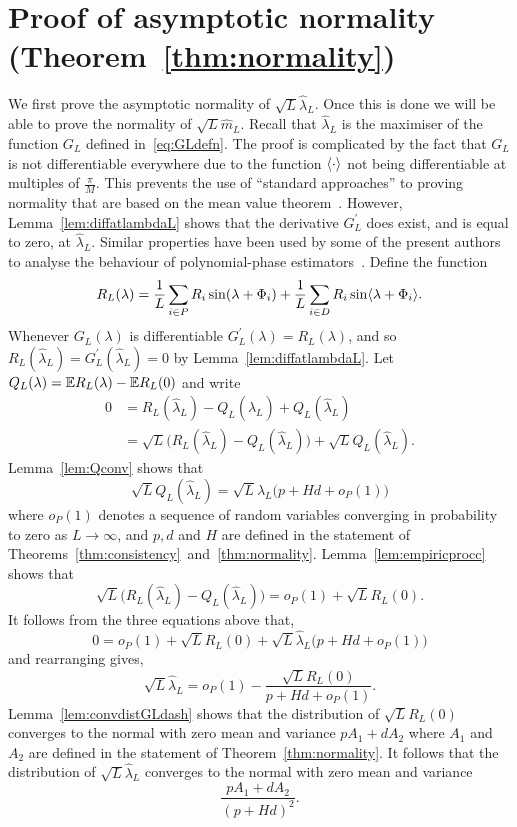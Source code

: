 \documentclass[draftcls, onecolumn, 11pt]{IEEEtran}
\begin{document}
\section{Proof of asymptotic normality (Theorem~\ref{thm:normality}) } \label{sec:proof-asympt-norm}

We first prove the asymptotic normality of $\sqrt{L} \hat{\lambda}_L$.  Once this is done we will be able to prove the normality of $\sqrt{L} \hat{m}_L$.  Recall that $\hat{\lambda}_L$ is the maximiser of the function $G_L$ defined in~\eqref{eq:GLdefn}.  The proof is complicated by the fact that $G_L$ is not differentiable everywhere due to the function $\left\langle \cdot \right\rangle$ not being differentiable at multiples of $\tfrac{\pi}{M}$.  This prevents the use of ``standard approaches'' to proving normality that are based on the mean value theorem~\cite{vonMises_diff_stats_1947,vanDerVart1971_asymptotic_stats,Pollard_new_ways_clts_1986,Pollard_conv_stat_proc_1984,Pollard_asymp_empi_proc_1989,van2009empirical}.  However, Lemma~\ref{lem:diffatlambdaL} shows that the derivative $G_L^\prime$ does exist, and is equal to zero, at $\hat{\lambda}_L$.  Similar properties have been used by some of the present authors to analyse the behaviour of polynomial-phase estimators~\cite{McKilliam_LSU_polyest_part_arxiv_2012}.  %
Define the function
\begin{equation}\label{eq:RLdef}
R_L(\lambda) = \frac{1}{L} \sum_{i \in P} R_i \sin(\lambda + \Phi_i) + \frac{1}{L} \sum_{i \in D} R_i \sin\langle \lambda + \Phi_i \rangle.
\end{equation}
Whenever $G_L(\lambda)$ is differentiable $G_L^\prime(\lambda) = R_L(\lambda)$, and so $R_L(\hat{\lambda}_L) = G_L^\prime(\hat{\lambda}_L) = 0$ by Lemma~\ref{lem:diffatlambdaL}.  Let $Q_L(\lambda) = {\mathbb E} R_L(\lambda) - {\mathbb E} R_L(0)$ and write
\begin{align*}
0 &= R_L(\hat{\lambda}_L) - Q_L(\hat{\lambda}_L) + Q_L(\hat{\lambda}_L) \\
&= \sqrt{L}\big( R_L(\hat{\lambda}_L) - Q_L(\hat{\lambda}_L) \big) + \sqrt{L}Q_L(\hat{\lambda}_L).
\end{align*}
Lemma~\ref{lem:Qconv} shows that
\[
\sqrt{L} Q_L(\hat{\lambda}_L) = \sqrt{L} \hat{\lambda}_L\big( p + Hd  + o_P(1) \big)
\]
where $o_P(1)$ denotes a sequence of random variables converging in probability to zero as $L \rightarrow \infty$, and $p,d$ and $H$ are defined in the statement of Theorems~\ref{thm:consistency}~and~\ref{thm:normality}.  Lemma~\ref{lem:empiricprocc} shows that
\[
\sqrt{L}\big( R_L(\hat{\lambda}_L) - Q_L(\hat{\lambda}_L) \big) = o_P(1) + \sqrt{L} R_L(0).
\]
It follows from the three equations above that,
\[
0 = o_P(1) + \sqrt{L}R_L(0) + \sqrt{L} \hat{\lambda}_L \big( p + Hd  + o_P(1) \big)
\]
and rearranging gives,
\[
\sqrt{L} \hat{\lambda}_L = o_P(1) - \frac{\sqrt{L}R_L(0)}{p + Hd  + o_P(1)}.
\]
Lemma~\ref{lem:convdistGLdash} shows that the distribution of $\sqrt{L}R_L(0)$ converges to the normal with zero mean and variance $pA_1 + dA_2$ where $A_1$ and $A_2$ are defined in the statement of Theorem~\ref{thm:normality}.  It follows that the distribution of $\sqrt{L}\hat{\lambda}_L$ converges to the normal with zero mean and variance
\[
\frac{pA_1 + dA_2}{(p + Hd)^2}.
\]
 
\end{document}
